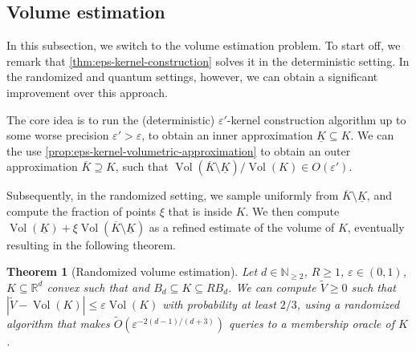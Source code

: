 \documentclass[11pt]{article}
\newtheorem{theorem}{Theorem}[section]
\newcommand{\N}{\ensuremath{\mathbb{N}}}
\newcommand{\R}{\ensuremath{\mathbb{R}}}
\DeclareMathOperator{\Vol}{Vol}
\begin{document}
    \subsection{Volume estimation}
    \label{subsec:alg-vol-est}

    In this subsection, we switch to the volume estimation problem. To start off, we remark that \cref{thm:eps-kernel-construction} solves it in the deterministic setting. In the randomized and quantum settings, however, we can obtain a significant improvement over this approach.

    The core idea is to run the (deterministic) $\varepsilon'$-kernel construction algorithm up to some worse precision $\varepsilon' > \varepsilon$, to obtain an inner approximation $\underline{K} \subseteq K$. We can the use \cref{prop:eps-kernel-volumetric-approximation} to obtain an outer approximation $\overline{K} \supseteq K$, such that $\Vol(\overline{K} \setminus \underline{K})/\Vol(K) \in O(\varepsilon')$.

    Subsequently, in the randomized setting, we sample uniformly from $\overline{K} \setminus \underline{K}$, and compute the fraction of points $\xi$ that is inside $K$. We then compute $\Vol(\underline{K}) + \xi\Vol(\overline{K} \setminus \underline{K})$ as a refined estimate of the volume of $K$, eventually resulting in the following theorem.

    \begin{theorem}[Randomized volume estimation]
        \label{thm:randomized-volume-estimation}
        Let $d \in \N_{\geq 2}$, $R \geq 1$, $\varepsilon \in (0,1)$, $K \subseteq \R^d$ convex such that and $B_d \subseteq K \subseteq RB_d$. We can compute $\widetilde{V} \geq 0$ such that $|\widetilde{V} - \Vol(K)| \leq \varepsilon\Vol(K)$ with probability at least $2/3$, using a randomized algorithm that makes $\widetilde{O}(\varepsilon^{-2(d-1)/(d+3)})$ queries to a membership oracle of $K$.
    \end{theorem}
\end{document}
